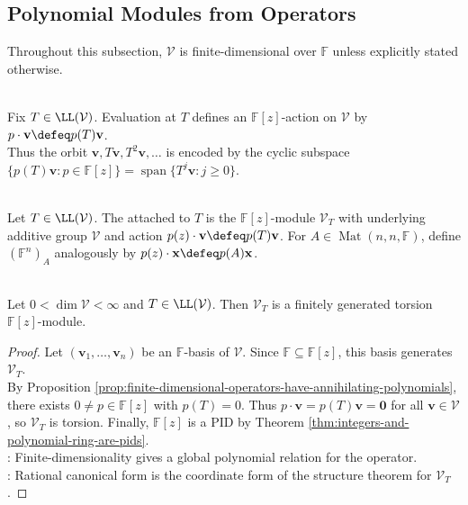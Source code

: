\subsection{Polynomial Modules from Operators}

Throughout this subsection, $\mathcal{V}$ is finite-dimensional over $\mathbb{F}$ unless explicitly stated otherwise.

\begin{perspective} \label{per:operator-as-polynomial-action} \\
Fix $T\in\LL(\mathcal{V})$. Evaluation at $T$ defines an $\mathbb{F}[z]$-action on $\mathcal{V}$ by $p\cdot\mathbf{v}\defeq p(T)\mathbf{v}$.\\
Thus the orbit $\mathbf{v},T\mathbf{v},T^2\mathbf{v},\ldots$ is encoded by the cyclic subspace $\{p(T)\mathbf{v}:p\in\mathbb{F}[z]\}=\operatorname{span}\{T^j\mathbf{v}:j\geq0\}$.
\end{perspective}

\begin{definition} \label{def:operator-module-and-matrix-module} \\
Let $T\in\LL(\mathcal{V})$. The  attached to $T$ is the $\mathbb{F}[z]$-module $\mathcal{V}_T$ with underlying additive group $\mathcal{V}$ and action $p(z)\cdot\mathbf{v}\defeq p(T)\mathbf{v}$.
For $A\in\operatorname{Mat}(n,n,\mathbb{F})$, define $(\mathbb{F}^n)_A$ analogously by $p(z)\cdot\mathbf{x}\defeq p(A)\mathbf{x}$.
\end{definition}

\begin{proposition} \label{prop:operator-modules-are-fg-torsion} \\
Let $0<\dim\mathcal{V}<\infty$ and $T\in\LL(\mathcal{V})$. Then $\mathcal{V}_T$ is a finitely generated torsion $\mathbb{F}[z]$-module.
\begin{proof}
Let $(\mathbf{v}_1,\ldots,\mathbf{v}_n)$ be an $\mathbb{F}$-basis of $\mathcal{V}$. Since $\mathbb{F}\subseteq\mathbb{F}[z]$, this basis generates $\mathcal{V}_T$.\\
By Proposition \ref{prop:finite-dimensional-operators-have-annihilating-polynomials}, there exists $0\neq p\in\mathbb{F}[z]$ with $p(T)=0$. Thus $p\cdot\mathbf{v}=p(T)\mathbf{v}=\mathbf{0}$ for all $\mathbf{v}\in\mathcal{V}$, so $\mathcal{V}_T$ is torsion. Finally, $\mathbb{F}[z]$ is a PID by Theorem \ref{thm:integers-and-polynomial-ring-are-pids}.\\
: Finite-dimensionality gives a global polynomial relation for the operator.\\
: Rational canonical form is the coordinate form of the structure theorem for $\mathcal{V}_T$.
\end{proof}
\end{proposition}

